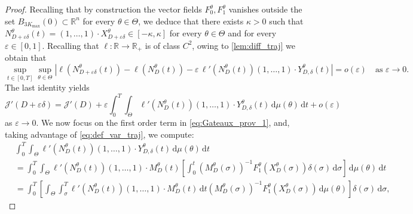 \documentclass[a4paper,12pt, reqno]{amsart}
\theoremstyle{plain}
\theoremstyle{definition}
\theoremstyle{remark}
\numberwithin{equation}{section}
\newcommand{\J}{\mathcal{J}}
\newcommand{\R}{\mathbb{R}}
\newcommand{\e}{\varepsilon}
\newcommand{\de}{\,\mathrm{d}}
\begin{document}
\begin{proof}
    Recalling that by construction the vector fields $F_0^\theta, F_1^\theta$ vanishes outside the set $B_{3K_{\max}}(0)\subset \R^{n}$ for every $\theta\in\Theta$, we deduce that there exists $\kappa>0$ such that ${N_{D+\e \delta}^\theta} ({t}) = (1,{\ldots,}1)\cdot {X_{D+\e \delta}^\theta} \in [-\kappa,\kappa]$ for every $\theta\in\Theta$ and for every $\e\in [0,1]$.
    Recalling that $\ell\colon \R \to \R_+$ is of class $C^2$, owing to \cref{lem:diff_traj} we obtain that
    \begin{equation*}
        \sup_{{t}\in [0,T]}\sup_{\theta\in\Theta} \left|\ell \left({N_{D+\e \delta}^\theta}({t})\right) 
        - \ell \left({N_D^\theta}({t})\right) - \e \, \ell' \left({N_D^\theta}({t}) \right) (1,{\ldots,}1)\cdot {Y_{D,\delta}^\theta}({t}) \right| = o(\e) \quad \mbox{as } \e\to 0.
    \end{equation*}
    The last identity yields
    \begin{equation} \label{eq:Gateaux_prov_1}
        \J'({D}+\e {\delta}) = \J'({D}) + 
        \e \int_0^T \int_\Theta \ell' \left({N_D^\theta}({t}) \right) (1,{\ldots,}1)\cdot {Y_{D,\delta}^\theta}({t})
        \de \mu(\theta) \de {t}
        + o(\e) \quad 
    \end{equation}
    as $\e\to 0$.
    We now focus on the first order term in \cref{eq:Gateaux_prov_1}, and, taking advantage of \cref{eq:def_var_traj}, we compute:
    \begin{equation} \label{eq:comput_grad}
        \begin{split}
        &  \int_0^T  \int_\Theta  \ell' \left({N_D^\theta}({t}) \right) (1,{\ldots,}1) \cdot {Y_{D,\delta}^\theta}({t})
        \de \mu(\theta) \de {t}
         \\
         &  =
        \int_0^T \int_\Theta \ell' \left({N_D^\theta}({t}) \right) (1,{\ldots,}1)\cdot 
        M_{D}^\theta({t}) 
        \left[ \int_0^{t} 
    \left(M_{D}^{\theta}(\sigma) \right)^{-1}
    F_1^\theta \left( {X_D^\theta}(\sigma) \right) {\delta}(\sigma) 
    \de \sigma \right]
        \de \mu(\theta) \de {t} \\
        &  =
        \int_0^T \left[
        \int_\Theta 
         \int_\sigma^T 
        \ell' \left({N_D^\theta}({t}) \right) (1,{\ldots,}1)\cdot 
        M_{D}^\theta({t}) 
        \de {t} 
    \left(M_{D}^{\theta}(\sigma) \right)^{-1}
    F_1^\theta \left( {X_D^\theta}(\sigma) \right)  \de \mu(\theta) \right]
    {\delta}(\sigma) 
    \de \sigma,
        \end{split}

\end{equation}
\end{proof}
\end{document}
